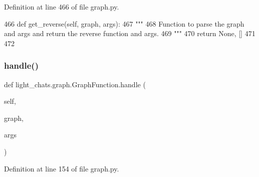 Definition at line 466 of file graph.\+py.


\begin{DoxyCode}
466     \textcolor{keyword}{def }get\_reverse(self, graph, args):
467         \textcolor{stringliteral}{"""}
468 \textcolor{stringliteral}{        Function to parse the graph and args and return the reverse function and args.}
469 \textcolor{stringliteral}{        """}
470         \textcolor{keywordflow}{return} \textcolor{keywordtype}{None}, []
471 
472 
\end{DoxyCode}
\mbox{\label{classlight__chats_1_1graph_1_1GraphFunction_a21e2dd1c8eb431b3ee22cce4853e3c15}} 
\subsubsection{\texorpdfstring{handle()}{handle()}}
{\footnotesize\ttfamily def light\+\_\+chats.\+graph.\+Graph\+Function.\+handle (\begin{DoxyParamCaption}\item[{}]{self,  }\item[{}]{graph,  }\item[{}]{args }\end{DoxyParamCaption})}



Definition at line 154 of file graph.\+py.


